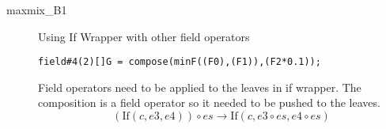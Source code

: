 \begin{description}
\item[maxmix\_B1]
Using If Wrapper with other field operators
\begin{lstlisting}[mathescape=true]
field#4(2)[]G = compose(minF((F0),(F1)),(F2*0.1));
\end{lstlisting}
Field operators need to be applied to the leaves in if wrapper. 
The composition is a field operator so it needed to be pushed to the leaves.
$$(\text{If}(c, e3,e4)) \circ es  
\rightarrow
\text{If}(c, e3  \circ es ,e4 \circ es) $$
\end{description}
